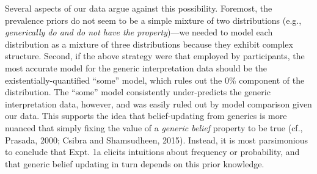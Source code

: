 \documentclass[floatsintext,doc]{apa6}
\let\rmarkdownfootnote\footnote%
\def\footnote{\protect\rmarkdownfootnote}
\begin{document}
Several aspects of our data argue against this possibility. 
Foremost, the prevalence priors do not seem to be a simple mixture of two distributions (e.g., \emph{generically do and do not have the property})---we needed to model each distribution as a mixture of three distributions because they exhibit complex structure. 
Second, if the above strategy were that employed by participants, the most accurate model for the generic interpretation data should be the existentially-quantified \enquote{some} model, which rules out the 0\% component of the distribution.
The ``some'' model consistently under-predicts the generic interpretation data, however, and was easily ruled out by model comparison given our data.
This supports the idea that belief-updating from generics is more nuanced that simply fixing the value of a \emph{generic belief} property to be true (cf., Prasada, 2000; Csibra and Shamsudheen, 2015).
Instead, it is most parsimonious to conclude that Expt. 1a elicits intuitions about frequency or probability, and that generic belief updating in turn depends on this prior knowledge.


%
%

\end{document}
